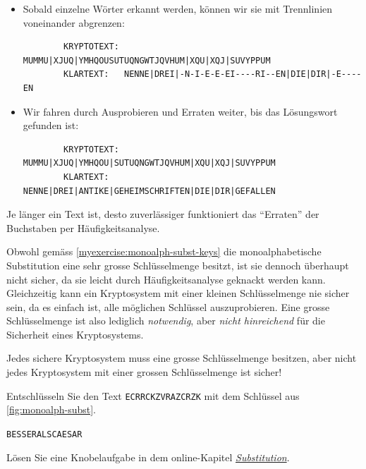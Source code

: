 \begin{myexample}
\begin{itemize}
\begin{verbatim}
		KRYPTOTEXT: MUMMUXJUQYMHQOUSUTUQNGWTJQVHUMXQUXQJSUVYPPUM
		KLARTEXT:   NENNEDREI-N-I-E-E-EI----RI--ENDIEDIR-E----EN
    \end{verbatim}
		\item Sobald einzelne Wörter erkannt werden, können wir sie mit Trennlinien voneinander abgrenzen:
		      \begin{verbatim}
		KRYPTOTEXT: MUMMU|XJUQ|YMHQOUSUTUQNGWTJQVHUM|XQU|XQJ|SUVYPPUM
		KLARTEXT:   NENNE|DREI|-N-I-E-E-EI----RI--EN|DIE|DIR|-E----EN
	\end{verbatim}
		\item Wir fahren durch Ausprobieren und Erraten weiter, bis das Lösungswort gefunden ist:
		      \begin{verbatim}
		KRYPTOTEXT: MUMMU|XJUQ|YMHQOU|SUTUQNGWTJQVHUM|XQU|XQJ|SUVYPPUM
		KLARTEXT:   NENNE|DREI|ANTIKE|GEHEIMSCHRIFTEN|DIE|DIR|GEFALLEN
	\end{verbatim}
	\end{itemize}
	Je länger ein Text ist, desto zuverlässiger funktioniert das \enquote{Erraten} der Buchstaben per Häufigkeitsanalyse.
\end{myexample}

\begin{myremark}
	Obwohl gemäss \cref{myexercise:monoalph-subst-keys} die monoalphabetische Substitution eine sehr grosse Schlüsselmenge besitzt, ist sie dennoch überhaupt nicht sicher, da sie leicht durch Häufigkeitsanalyse geknackt werden kann.
	Gleichzeitig kann ein Kryptosystem mit einer kleinen Schlüsselmenge nie sicher sein, da es einfach ist, alle möglichen Schlüssel auszuprobieren.
	Eine grosse Schlüsselmenge ist also lediglich \emph{notwendig}, aber \emph{nicht hinreichend} für die Sicherheit eines Kryptosystems.

	\par
	Jedes sichere Kryptosystem muss eine grosse Schlüsselmenge besitzen, aber nicht jedes Kryptosystem mit einer grossen Schlüsselmenge ist sicher!
\end{myremark}

\begin{myexercise}
	Entschlüsseln Sie den Text \texttt{ECRRCKZVRAZCRZK} mit dem Schlüssel aus \cref{fig:monoalph-subst}.
	\begin{myanswer}
		\texttt{BESSERALSCAESAR}
	\end{myanswer}
\end{myexercise}

\begin{mychallenge}
	Lösen Sie eine Knobelaufgabe in dem online-Kapitel \emph{\href{https://cryptbreaker.marcwidmer.xyz/problems/substitution}{Substitution}}.
\end{mychallenge}